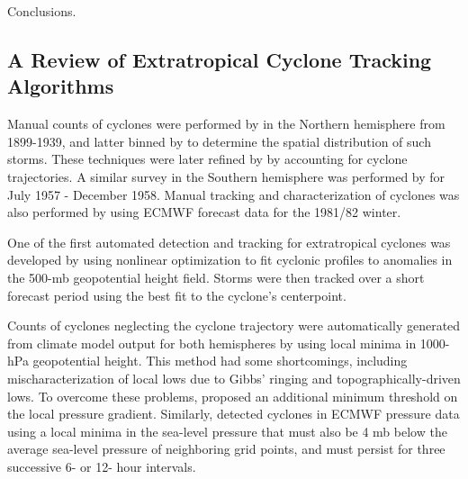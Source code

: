 \documentclass[gmdd, hvmath, online]{copernicus_discussions}
\begin{document}
\conclusions \label{sec:Conclusions}

Conclusions.


\pagebreak
\begin{acknowledgements}

\end{acknowledgements}
\pagebreak


\appendix
\subsection{A Review of Extratropical Cyclone Tracking Algorithms} \label{sec:ExtratropicalCycloneAlgorithms}

Manual counts of cyclones were performed by \cite{petterssen1956weather} in the Northern hemisphere from 1899-1939, and latter binned by \cite{klein1957principle} to determine the spatial distribution of such storms.  These techniques were later refined by \cite{whittaker1982atlas} by accounting for cyclone trajectories.  A similar survey in the Southern hemisphere was performed by \cite{taljaard1967development} for July 1957 - December 1958.  Manual tracking and characterization of cyclones was also performed by \cite{akyildiz1985systematic} using ECMWF forecast data for the 1981/82 winter.

One of the first automated detection and tracking for extratropical cyclones was developed by \cite{williamson1981storm} using nonlinear optimization to fit cyclonic profiles to anomalies in the 500-mb geopotential height field.  Storms were then tracked over a short forecast period using the best fit to the cyclone's centerpoint.

Counts of cyclones neglecting the cyclone trajectory were automatically generated from climate model output for both hemispheres by \cite{lambert1988cyclone} using local minima in 1000-hPa geopotential height.  This method had some shortcomings, including mischaracterization of local lows due to Gibbs' ringing and topographically-driven lows.  To overcome these problems, \cite{alpert1990climatological} proposed an additional minimum threshold on the local pressure gradient.  Similarly, \cite{le1990comparison} detected cyclones in ECMWF pressure data using a local minima in the sea-level pressure that must also be 4 mb below the average sea-level pressure of neighboring grid points, and must persist for three successive 6- or 12- hour intervals.
\end{document}
